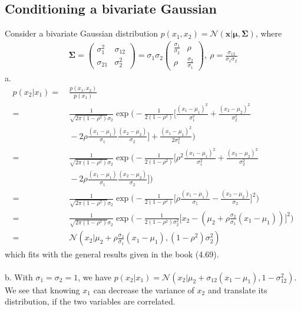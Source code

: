 \documentclass{article}
\begin{document}
\subsection{Conditioning a bivariate Gaussian}
Consider a bivariate Gaussian distribution $p(x_1,x_2) = \mathcal{N}(\bm{x}|\bm{\mu},\bm{\Sigma})$, where
\begin{gather*}
\bm{\Sigma} = \begin{pmatrix}\sigma_1^2&\sigma_{12}\\\sigma_{21}&\sigma_2^2\end{pmatrix} = \sigma_1\sigma_2 \begin{pmatrix}\frac{\sigma_1}{\sigma_2}&\rho\\\rho&\frac{\sigma_2}{\sigma_1}\end{pmatrix},\ \rho = \frac{\sigma_{12}}{\sigma_1\sigma_2}
\end{gather*}
a.
\begin{align*}
p(x_2|x_1) =&\ \frac{p(x_1,x_2)}{p(x_1)}\\
=&\ \frac{1}{\sqrt{2\pi(1-\rho^2)}\sigma_2} \exp\bigg( -\frac{1}{2(1-\rho^2)}\bigg[ \frac{(x_1-\mu_1)^2}{\sigma_1^2} + \frac{(x_2-\mu_2)^2}{\sigma_2^2}\\
&\ - 2\rho\frac{(x_1-\mu_1)}{\sigma_1}\frac{(x_2-\mu_2)}{\sigma_2} \bigg] + \frac{(x_1-\mu_1)^2}{2\sigma_1^2} \bigg)\\
=&\ \frac{1}{\sqrt{2\pi(1-\rho^2)}\sigma_2} \exp\bigg( -\frac{1}{2(1-\rho^2)}\bigg[ \rho^2\frac{(x_1-\mu_1)^2}{\sigma_1^2} + \frac{(x_2-\mu_2)^2}{\sigma_2^2}\\
&\ - 2\rho\frac{(x_1-\mu_1)}{\sigma_1}\frac{(x_2-\mu_2)}{\sigma_2} \bigg] \bigg)\\
=&\ \frac{1}{\sqrt{2\pi(1-\rho^2)}\sigma_2} \exp\bigg( -\frac{1}{2(1-\rho^2)}\bigg[ \rho\frac{(x_1-\mu_1)}{\sigma_1} - \frac{(x_2-\mu_2)}{\sigma_2} \bigg]^2 \bigg)\\
=&\ \frac{1}{\sqrt{2\pi(1-\rho^2)}\sigma_2} \exp\bigg( -\frac{1}{2(1-\rho^2)\sigma_2^2}\bigg[ x_2 - (\mu_2 + \rho\frac{\sigma_2}{\sigma_1}(x_1-\mu_1)) \bigg]^2 \bigg)\\
=&\ \mathcal{N}(x_2|\mu_2 + \rho\frac{\sigma_2}{\sigma_1}(x_1-\mu_1),(1-\rho^2)\sigma_2^2)
\end{align*}
which fits with the general results given in the book (4.69).\\\\
b. With $\sigma_1=\sigma_2=1$, we have $p(x_2|x_1) = \mathcal{N}(x_2|\mu_2+\sigma_{12}(x_1-\mu_1),1-\sigma_{12}^2)$. We see that knowing $x_1$ can decrease the variance of $x_2$ and translate its distribution, if the two variables are correlated.
\end{document}
